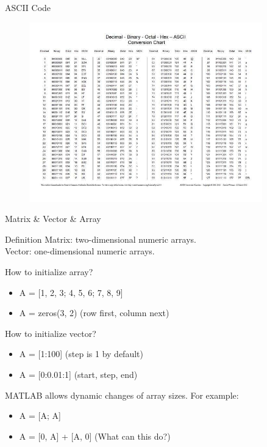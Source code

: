 \begin{frame}{ASCII Code}
\begin{figure}[htbp]
\centering
\includegraphics[width=0.9\textwidth]{pic/ascii.jpeg}
\end{figure}
\end{frame}

\begin{frame}{Matrix \& Vector \& Array}
\begin{block}{Definition}
Matrix: two-dimensional numeric arrays.\\
Vector: one-dimensional numeric arrays.
\end{block}
How to initialize array?
\begin{itemize}
\item A = [1, 2, 3; 4, 5, 6; 7, 8, 9]
\item A = zeros(3, 2) (row first, column next)
\end{itemize}
How to initialize vector?
\begin{itemize}
\item A = [1:100] (step is 1 by default)
\item A = [0:0.01:1] (start, step, end)
\end{itemize}
MATLAB allows dynamic changes of array sizes. For example:
\begin{itemize}
\item A = [A; A]
\item A = [0, A] + [A, 0] (What can this do?)
\end{itemize}
\end{frame}

